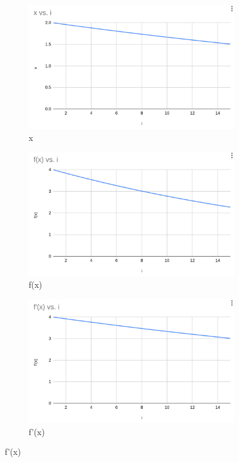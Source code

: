 \documentclass{article}
\begin{document}
\begin{figure}
    \centering
    \begin{subfigure}{0.3\linewidth}
        \centering
        \includegraphics[width=\linewidth]{x_s.png}
        \caption{x}
        \label{fig:enter-label}
    \end{subfigure}
    
    \begin{subfigure}{0.3\linewidth}
        \centering
        \includegraphics[width=\linewidth]{fx_s.png}
        \caption{f(x)}
        \label{fig:enter-label}
    \end{subfigure}
    
    \begin{subfigure}{0.3\linewidth}
        \centering
        \includegraphics[width=\linewidth]{f_prime_s.png}
        \caption{f'(x)}
        \label{fig:enter-label}
    \end{subfigure}


\end{figure}
\end{document}
